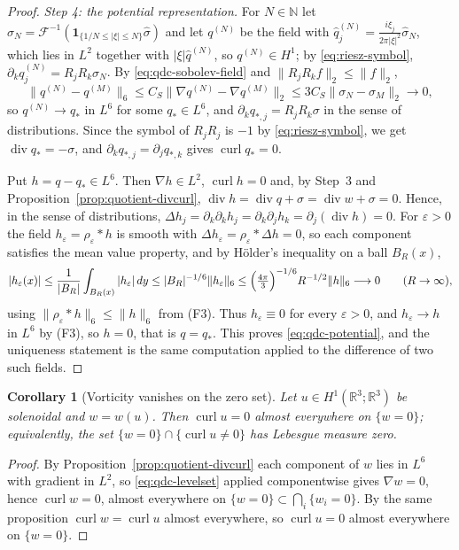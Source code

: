 \documentclass[11pt]{article}
\newtheorem{corollary}[theorem]{Corollary}
\theoremstyle{definition}
\theoremstyle{plain}
\newcommand{\R}{\mathbb R}
\newcommand{\norm}[1]{\lVert #1\rVert}
\begin{document}
\begin{proof}
\emph{Step 4: the potential representation.}  For $N\in\mathbb N$ let
$\sigma_N=\mathcal F^{-1}(\mathbf1_{\{1/N\le|\xi|\le N\}}\hat\sigma)$ and let
$q^{(N)}$ be the field with
$\hat q^{(N)}_j=\frac{i\xi_j}{2\pi|\xi|^2}\hat\sigma_N$, which lies in $L^2$
together with $|\xi|\hat q^{(N)}$, so $q^{(N)}\in H^1$; by
\eqref{eq:riesz-symbol}, $\partial_kq^{(N)}_j=R_jR_k\sigma_N$.  By
\eqref{eq:qdc-sobolev-field} and $\norm{R_jR_kf}_2\le\norm f_2$,
\[
 \norm{q^{(N)}-q^{(M)}}_6
 \le C_S\norm{\nabla q^{(N)}-\nabla q^{(M)}}_2
 \le3C_S\norm{\sigma_N-\sigma_M}_2\longrightarrow0 ,
\]
so $q^{(N)}\to q_*$ in $L^6$ for some $q_*\in L^6$, and
$\partial_kq_{*,j}=R_jR_k\sigma$ in the sense of distributions.  Since the
symbol of $R_jR_j$ is $-1$ by \eqref{eq:riesz-symbol}, we get
$\operatorname{div}q_*=-\sigma$, and $\partial_kq_{*,j}=\partial_jq_{*,k}$
gives $\operatorname{curl}q_*=0$.

Put $h=q-q_*\in L^6$.  Then $\nabla h\in L^2$, $\operatorname{curl}h=0$ and,
by Step~3 and Proposition~\ref{prop:quotient-divcurl},
$\operatorname{div}h=\operatorname{div}q+\sigma=\operatorname{div}w+\sigma=0$.
Hence, in the sense of distributions,
$\Delta h_j=\partial_k\partial_kh_j=\partial_k\partial_jh_k
=\partial_j(\operatorname{div}h)=0$.  For $\varepsilon>0$ the field
$h_\varepsilon=\rho_\varepsilon*h$ is smooth with
$\Delta h_\varepsilon=\rho_\varepsilon*\Delta h=0$, so each component
satisfies the mean value property, and by H\"older's inequality on a ball
$B_R(x)$,
\[
 |h_\varepsilon(x)|\le\frac1{|B_R|}\int_{B_R(x)}|h_\varepsilon|\,dy
 \le|B_R|^{-1/6}\norm{h_\varepsilon}_6
 \le\Bigl(\tfrac{4\pi}3\Bigr)^{-1/6}R^{-1/2}\norm h_6
 \longrightarrow0\qquad(R\to\infty),
\]
using $\norm{\rho_\varepsilon*h}_6\le\norm h_6$ from (F3).  Thus
$h_\varepsilon\equiv0$ for every $\varepsilon>0$, and $h_\varepsilon\to h$ in
$L^6$ by (F3), so $h=0$, that is $q=q_*$.  This proves
\eqref{eq:qdc-potential}, and the uniqueness statement is the same
computation applied to the difference of two such fields.
\end{proof}

\begin{corollary}[Vorticity vanishes on the zero set]
\label{cor:quotient-vorticity-zero}
Let $u\in H^1(\R^3;\R^3)$ be solenoidal and $w=w(u)$.  Then
$\operatorname{curl}u=0$ almost everywhere on $\{w=0\}$; equivalently, the
set $\{w=0\}\cap\{\operatorname{curl}u\ne0\}$ has Lebesgue measure zero.
\end{corollary}

\begin{proof}
By Proposition~\ref{prop:quotient-divcurl} each component of $w$ lies in
$L^6$ with gradient in $L^2$, so \eqref{eq:qdc-levelset} applied
componentwise gives $\nabla w=0$, hence $\operatorname{curl}w=0$, almost
everywhere on $\{w=0\}\subset\bigcap_i\{w_i=0\}$.  By the same proposition
$\operatorname{curl}w=\operatorname{curl}u$ almost everywhere, so
$\operatorname{curl}u=0$ almost everywhere on $\{w=0\}$.
\end{proof}
\end{document}
